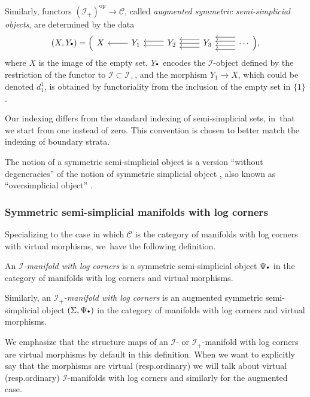 \documentclass[10pt]{amsart}
\let\oldbullet\bullet
\renewcommand{\bullet}{{\raisebox{1pt}{$\scriptscriptstyle\oldbullet$}}}
\newcommand{\rBrac}[1]{\Bigl(#1\Bigr)}
\theoremstyle{definition}
\theoremstyle{remark}
\newenvironment{remark}
  {\pushQED{\qed}\renewcommand{\qedsymbol}{$\lozenge$}\remarkx}
  {\popQED\endremarkx}
\let\defn\emph
\newcommand{\augsimp}[4]
{
\begin{tikzcd}[ampersand replacement=\&]
     #1 \& #2 \ar[l] \& #3
     \ar[l,shift left = 1]\ar[l,shift right=1] \& #4 \ar[l,shift left = 2]\ar[l,shift left = 0]\ar[l,shift left = -2] \& \ar[l,shift left = 3]\ar[l,shift left = 1]\ar[l,shift left = -1]\ar[l,shift left = -3] \cdots
    \end{tikzcd}
}
\newcommand{\scat}{\mathscr{I}}
\newcommand{\ascat}{\mathscr{I}_+}
\newcommand{\op}{\mathrm{op}}
\providecommand{\resp}{resp.}\providecommand{\cf}{cf.}\providecommand{\etc}{etc.}
\begin{document}
Similarly, functors $(\ascat)^\op \to \mathscr{C}$, called \defn{augmented symmetric semi-simplicial objects}, are determined by the data\vspace*{-3pt}\enlargethispage{.5\baselineskip}
\[
(X,Y_\bullet) = \rBrac{\augsimp{X}{Y_1}{Y_2}{Y_3}},
\]
where $X$ is the image of the empty set, $Y_\bullet$ encodes the $\scat$-object defined by the restriction of the functor to $\scat\subset\ascat$, and the morphism $Y_1 \to X$, which could be denoted $d^1_1$, is obtained by functoriality from the inclusion of the empty set in $\{1\}$.

\begin{remark}
Our indexing differs from the standard indexing of semi-simplicial sets, in~that we start from one instead of zero. This convention is chosen to better match the indexing of boundary strata.
\end{remark}

\begin{remark}
The notion of a symmetric semi-simplicial object is a version ``without degeneracies'' of the notion of symmetric simplicial object \cite{grandis}, also known as ``oversimplicial object'' \cite{saitowild}.
\end{remark}

\subsubsection{Symmetric semi-simplicial manifolds with log corners}

Specializing to the case in which $\mathscr{C}$ is the category of manifolds with log corners with virtual morphisms, we~have the following definition.

\begin{definition}
An \defn{$\scat$-manifold with log corners} is a symmetric semi-simplicial object $\Psi_\bullet$ in the category of manifolds with log corners and virtual morphisms.

Similarly, an \defn{$\ascat$-manifold with log corners} is an augmented symmetric semi-simplicial object $(\Sigma,\Psi_\bullet)$ in the category of manifolds with log corners and virtual morphisms.
\end{definition}

We emphasize that the structure maps of an $\scat$- or $\ascat$-manifold with log corners are virtual morphisms by default in this definition. When we want to explicitly say that the morphisms are virtual (\resp ordinary) we will talk about virtual (\resp ordinary) $\scat$-manifolds with log corners and similarly for the augmented case.
\end{document}
